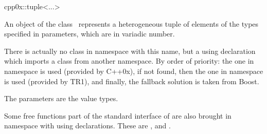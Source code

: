 

\begin{ccRefClass}{cpp0x::tuple<...>}

\ccDefinition

An object of the class \ccClassTemplateName\ represents a heterogeneous tuple of elements
of the types specified in parameters, which are in variadic number.

There is actually no class in namespace  with this name, but a using declaration which
imports a class from another namespace.  By order of priority: the one in namespace
 is used (provided by C++0x), if not found, then the one in namespace
 is used (provided by TR1), and finally, the fallback solution 
is taken from Boost.


  \ccParameters

  The parameters  are the value types.


Some free functions part of the standard interface of  are also
brought in namespace  with using declarations.  These are ,
 and .

\end{ccRefClass}

\ccParDims
